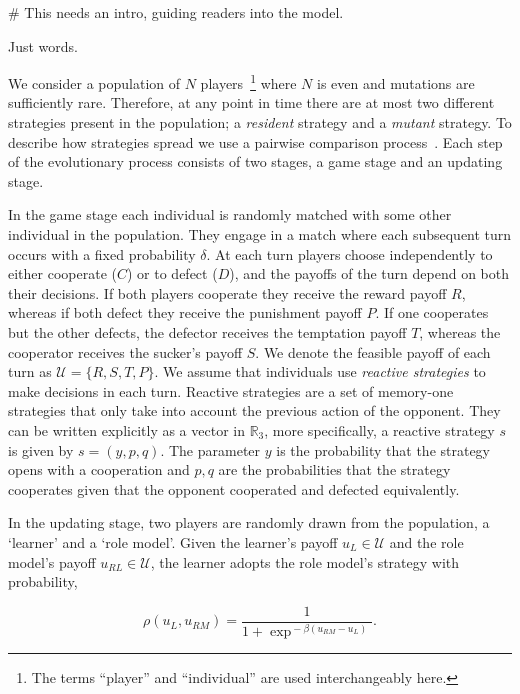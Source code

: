 \documentclass[11pt]{article}
\newcommand{\R}{\mathbb{R}}
\theoremstyle{plainCl1}
\theoremstyle{plainCl2}
\begin{document}
# This needs an intro, guiding readers into the model.

Just words.

We consider a population of \(N\) players~\footnote{The terms ``player'' and
``individual'' are used interchangeably here.} where \(N\) is even and mutations
are sufficiently rare. Therefore, at any point in time there are at most two
different strategies present in the population; a \textit{resident} strategy and
a \textit{mutant} strategy. To describe how strategies spread we use a pairwise
comparison process~\cite{Traulsen2006}.
Each step of the evolutionary process consists of two
stages, a game stage and an updating stage.

In the game stage each individual is randomly matched with some other individual
in the population. They engage in a match where each subsequent turn
occurs with a fixed probability $\delta$. At each turn players choose independently to
either cooperate (\(C\)) or to defect (\(D\)), and the payoffs of the turn
depend on both their decisions. If both players cooperate they receive the
reward payoff \(R\), whereas if both defect they receive the punishment payoff
\(P\). If one cooperates but the other defects, the defector receives the
temptation payoff \(T\), whereas the cooperator receives the sucker's
payoff \(S\). We denote the feasible payoff of each turn as \(\mathcal{U} =
\{R, S, T, P\}\).
We assume that individuals use \textit{reactive strategies} to make
decisions in each turn. Reactive strategies are a set of memory-one strategies
that only take into account the previous action of the opponent. They can be
written explicitly as a vector in \(\R_{3}\), more specifically, a reactive
strategy \(s\) is given by \(s=(y, p, q)\). The parameter \(y\) is the probability that
the strategy opens with a cooperation and \(p, q\) are the probabilities that
the strategy cooperates given that the opponent cooperated and defected
equivalently.

In the updating stage, two players are randomly drawn from the population, a
`learner' and a `role model'. Given the learner's payoff $u_L\!\in\!
\mathcal{U}$ and the role model's payoff $u_{RL}\!\in\! \mathcal{U}$,
the learner adopts the role model's strategy with probability,

\begin{equation} \label{Eq:rho}
  \rho(u_{L}, u_{RM}) = \frac{1}{1\!+\! \exp^{\!-\!\beta (u_{RM}\!-\!u_{L})}}.
\end{equation}
\end{document}
